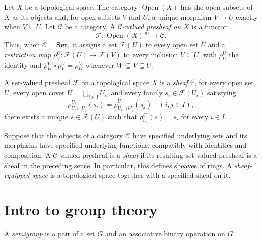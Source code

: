 \begin{defn}
Let $X$ be a topological space. The category
$\operatorname{Open}(X)$ has the open subsets of $X$ as its objects
and, for open subsets $V$ and $U$, a unique morphism $V\to U$ exactly
when $V\subseteq U$. Let $\mathcal{C}$ be a category. A
\emph{$\mathcal{C}$-valued presheaf on $X$} is a functor
\[
 \mathcal{F}:\operatorname{Open}(X)^{\operatorname{op}}
 \to\mathcal{C}.
\]
Thus, when $\mathcal{C}=\mathbf{Set}$, it assigns a set $\mathcal{F}(U)$
to every open set $U$ and a \emph{restriction map}
$\rho^U_V:\mathcal{F}(U)\to\mathcal{F}(V)$ to every inclusion
$V\subseteq U$, with $\rho^U_U$ the identity and
$\rho^V_W\circ\rho^U_V=\rho^U_W$ whenever $W\subseteq V\subseteq U$.
\end{defn}

\begin{defn}
A set-valued presheaf $\mathcal{F}$ on a topological space $X$ is a
\emph{sheaf} if, for every open set $U$, every open cover
$U=\bigcup_{i\in I}U_i$, and every family
$s_i\in\mathcal{F}(U_i)$ satisfying
\[
 \rho^{U_i}_{U_i\cap U_j}(s_i)
 =\rho^{U_j}_{U_i\cap U_j}(s_j)\quad(i,j\in I),
\]
there exists a unique $s\in\mathcal{F}(U)$ such that
$\rho^U_{U_i}(s)=s_i$ for every $i\in I$.

Suppose that the objects of a category $\mathcal{C}$ have specified
underlying sets and its morphisms have specified underlying functions,
compatibly with identities and composition. A $\mathcal{C}$-valued
presheaf is a \emph{sheaf} if its resulting set-valued presheaf is a
sheaf in the preceding sense. In particular, this defines sheaves of
rings. A \emph{sheaf-equipped space} is a topological space together
with a specified sheaf on it.
\end{defn}

\section{Intro to group theory}
\begin{defn}
A \emph{semigroup} is a pair of a set $G$ and an associative
binary operation on $G$.
\end{defn}


